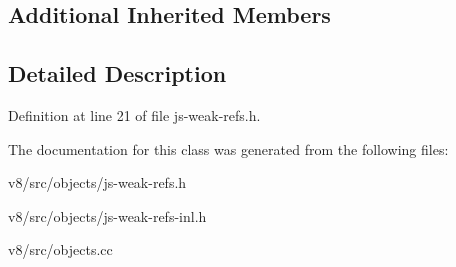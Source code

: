 \subsection*{Additional Inherited Members}


\subsection{Detailed Description}


Definition at line 21 of file js-\/weak-\/refs.\+h.



The documentation for this class was generated from the following files\+:\begin{DoxyCompactItemize}
\item 
v8/src/objects/js-\/weak-\/refs.\+h\item 
v8/src/objects/js-\/weak-\/refs-\/inl.\+h\item 
v8/src/objects.\+cc\end{DoxyCompactItemize}
